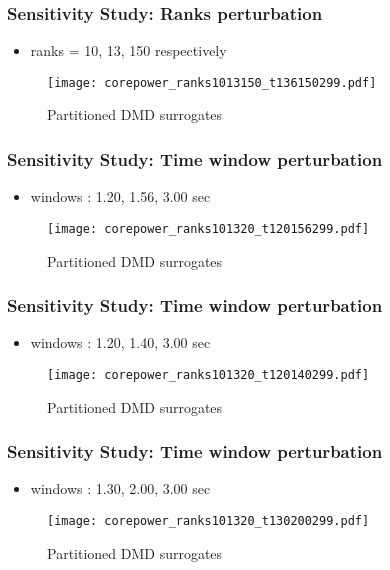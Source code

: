 \documentclass[fleqn]{beamer}
\begin{document}
\begin{frame}
\frametitle{Sensitivity Study: Ranks perturbation}
\begin{itemize}
 \item ranks = 10, 13, 150 respectively
\end{itemize}
\begin{figure}[ht]
\texttt{[image: corepower\_ranks1013150\_t136150299.pdf]}
\caption{Partitioned DMD surrogates}
\end{figure}
\end{frame}

\begin{frame}
\frametitle{Sensitivity Study: Time window perturbation}
\begin{itemize}
 \item windows : 1.20, 1.56, 3.00 sec
\end{itemize}
\begin{figure}[ht]
\texttt{[image: corepower\_ranks101320\_t120156299.pdf]}
\caption{Partitioned DMD surrogates}
\end{figure}
\end{frame}

\begin{frame}
\frametitle{Sensitivity Study: Time window perturbation}
\begin{itemize}
 \item windows : 1.20, 1.40, 3.00 sec
\end{itemize}
\begin{figure}[ht]
\texttt{[image: corepower\_ranks101320\_t120140299.pdf]}
\caption{Partitioned DMD surrogates}
\end{figure}
\end{frame}

\begin{frame}
\frametitle{Sensitivity Study: Time window perturbation}
\begin{itemize}
 \item windows : 1.30, 2.00, 3.00 sec
\end{itemize}
\begin{figure}[ht]
\texttt{[image: corepower\_ranks101320\_t130200299.pdf]}
\caption{Partitioned DMD surrogates}
\end{figure}
\end{frame}
\end{document}
